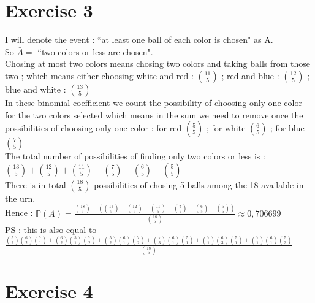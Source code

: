 \documentclass{article}
\begin{document}
    \section*{Exercise 3}
    I will denote the event : ``at least one ball of each color is chosen" as A.
    \\
    So $\bar{A} = $ ``two colors or less are chosen".
    \\
    Chosing at most two colors means chosing two colors and taking balls from
     those two
    ; which means either choosing white and red : $\binom{11}{5}$ ; red and blue 
    : $\binom{12}{5}$ ; blue and white : $\binom{13}{5}$
    \\
    In these binomial coefficient we count the possibility of choosing only one color
     for the two colors selected which means in the sum we need to remove once the possibilities
     of choosing only one color : for red $\binom{5}{5}$ ; for white $\binom{6}{5}$ ; for blue $\binom{7}{5}$
    \\
    The total number of possibilities of finding only two colors or less is : $\binom{13}{5} + \binom{12}{5} + 
    \binom{11}{5} - \binom{7}{5} - \binom{6}{5} - \binom{5}{5} $
    \\
    There is in total $\binom{18}{5}$ possibilities of chosing 5 balls among the 18 available in the urn.
    \\
    Hence : $\boxed{\mathbb{P}(A) = \frac{\binom{18}{5}-(\binom{13}{5} + \binom{12}{5} + 
    \binom{11}{5} - \binom{7}{5} - \binom{6}{5} - \binom{5}{5}) }
    {\binom{18}{5}} \approx 0,706699}$\\
    PS : this is also equal to $\frac{\binom{5}{2}\binom{6}{2}\binom{7}{1}+\binom{6}{2}\binom{5}{1}\binom{7}{2}+\binom{5}{2}\binom{6}{1}\binom{7}{2}+\binom{7}{3}\binom{6}{1}\binom{5}{1}+\binom{7}{1}\binom{6}{3}\binom{5}{1}+\binom{7}{1}\binom{6}{1}\binom{5}{3}}{\binom{18}{5}}$
    \section*{Exercise 4}
\end{document}
